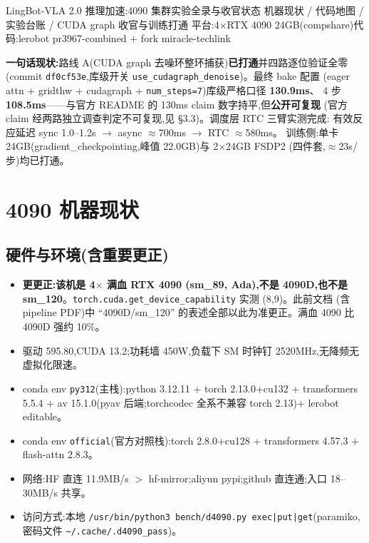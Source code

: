 \documentclass[11pt]{ctexart}
\begin{document}
{LingBot-VLA 2.0 推理加速:4090 集群实验全录与收官状态}
{机器现状 / 代码地图 / 实验台账 / CUDA graph 收官与训练打通}
{平台:4$\times$RTX 4090 24GB(compshare)\quad 代码:lerobot pr3967-combined + fork miracle-techlink}

\begin{quotebox}
\textbf{一句话现状:}路线 A(CUDA graph 去噪环整环捕获)\textbf{已打通}并四路逐位验证全零
(commit \texttt{df0cf53e},库级开关 \texttt{use\_cudagraph\_denoise})。最终 bake 配置
(eager attn + gridthw + cudagraph + \texttt{num\_steps=7})库级严格口径 \textbf{130.9ms}、
4 步 \textbf{108.5ms}——与官方 README 的 130ms claim 数字持平,但\textbf{公开可复现}
(官方 claim 经两路独立调查判定不可复现,见 §3.3)。调度层 RTC 三臂实测完成:
有效反应延迟 sync 1.0--1.2s $\to$ async $\approx$700ms $\to$ RTC $\approx$580ms。
训练侧:单卡 24GB(gradient\_checkpointing,峰值 22.0GB)与 2$\times$24GB FSDP2
(四件套,$\approx$23s/步)均已打通。
\end{quotebox}

\section{4090 机器现状}

\subsection{硬件与环境(含重要更正)}
\begin{itemize}
\item \textbf{更更正:该机是 4$\times$ 满血 RTX 4090 (sm\_89, Ada),不是 4090D,也不是
sm\_120}。\texttt{torch.cuda.}\texttt{get\_device\_capability} 实测 (8,9)。此前文档
(含 pipeline PDF)中 ``4090D/sm\_120'' 的表述全部以此为准更正。满血 4090 比 4090D 强约 10\%。
\item 驱动 595.80,CUDA 13.2;功耗墙 450W,负载下 SM 时钟钉 2520MHz,无降频无虚拟化限速。
\item conda env \texttt{py312}(主栈):python 3.12.11 + torch 2.13.0+cu132 + transformers 5.5.4
+ av 15.1.0(pyav 后端;torchcodec 全系不兼容 torch 2.13)+ lerobot editable。
\item conda env \texttt{official}(官方对照栈):torch 2.8.0+cu128 + transformers 4.57.3 + flash-attn 2.8.3。
\item 网络:HF 直连 11.9MB/s $>$ hf-mirror;aliyun pypi;github 直连通;入口 18--30MB/s 共享。
\item 访问方式:本地 \texttt{/usr/bin/python3 bench/d4090.py exec|put|get}(paramiko,
密码文件 \texttt{\textasciitilde/.cache/.d4090\_pass})。
\end{itemize}
\end{document}
